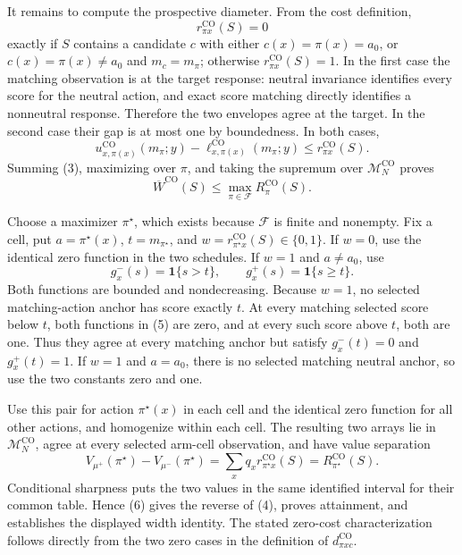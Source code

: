It remains to compute the prospective diameter.  From the cost definition,
\[
r^{\mathrm{CO}}_{\pi x}(S)=0
\]
exactly if \(S\) contains a candidate \(c\) with either \(c(x)=\pi(x)=a_0\), or \(c(x)=\pi(x)\neq a_0\) and \(m_c=m_\pi\); otherwise \(r^{\mathrm{CO}}_{\pi x}(S)=1\).  In the first case the matching observation is at the target response: neutral invariance identifies every score for the neutral action, and exact score matching directly identifies a nonneutral response.  Therefore the two envelopes agree at the target.  In the second case their gap is at most one by boundedness.  In both cases,
\[
u^{\mathrm{CO}}_{x,\pi(x)}(m_\pi;y)
-\ell^{\mathrm{CO}}_{x,\pi(x)}(m_\pi;y)
\leq r^{\mathrm{CO}}_{\pi x}(S).
\tag{3}
\]
Summing (3), maximizing over \(\pi\), and taking the supremum over \(\mathcal M_N^{\mathrm{CO}}\) proves
\[
\overline W^{\mathrm{CO}}(S)
\leq\max_{\pi\in\mathcal F}R^{\mathrm{CO}}_\pi(S).
\tag{4}
\]

Choose a maximizer \(\pi^\star\), which exists because \(\mathcal F\) is finite and nonempty.  Fix a cell, put \(a=\pi^\star(x)\), \(t=m_{\pi^\star}\), and \(w=r^{\mathrm{CO}}_{\pi^\star x}(S)\in\{0,1\}\).  If \(w=0\), use the identical zero function in the two schedules.  If \(w=1\) and \(a\neq a_0\), use
\[
g_x^-(s)=\mathbf 1\{s>t\},
\qquad
g_x^+(s)=\mathbf 1\{s\geq t\}.
\tag{5}
\]
Both functions are bounded and nondecreasing.  Because \(w=1\), no selected matching-action anchor has score exactly \(t\).  At every matching selected score below \(t\), both functions in (5) are zero, and at every such score above \(t\), both are one.  Thus they agree at every matching anchor but satisfy \(g_x^-(t)=0\) and \(g_x^+(t)=1\).  If \(w=1\) and \(a=a_0\), there is no selected matching neutral anchor, so use the two constants zero and one.

Use this pair for action \(\pi^\star(x)\) in each cell and the identical zero function for all other actions, and homogenize within each cell.  The resulting two arrays lie in \(\mathcal M_N^{\mathrm{CO}}\), agree at every selected arm-cell observation, and have value separation
\[
V_{\mu^+}(\pi^\star)-V_{\mu^-}(\pi^\star)
=\sum_xq_xr^{\mathrm{CO}}_{\pi^\star x}(S)
=R^{\mathrm{CO}}_{\pi^\star}(S).
\tag{6}
\]
Conditional sharpness puts the two values in the same identified interval for their common table.  Hence (6) gives the reverse of (4), proves attainment, and establishes the displayed width identity.  The stated zero-cost characterization follows directly from the two zero cases in the definition of \(d^{\mathrm{CO}}_{\pi xc}\).
